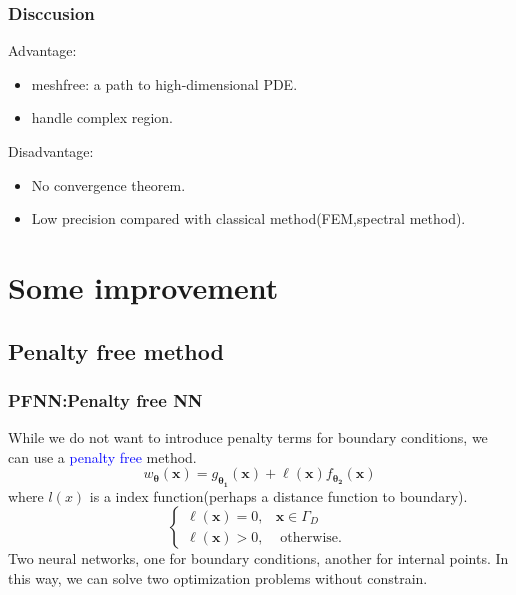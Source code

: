 \documentclass[8pt,aspectratio=15,mathserif]{beamer}
\begin{document}
\begin{frame}
\frametitle{Disccusion}
Advantage:
\begin{itemize}
\item meshfree: a path to high-dimensional PDE.
\item handle complex region.
\end{itemize}
Disadvantage:
\begin{itemize}
\item No convergence theorem.
\item Low precision compared with classical method(FEM,spectral method).
\end{itemize}
\end{frame}

\section{Some improvement}
\subsection{Penalty free method}
\begin{frame}
\frametitle{PFNN:Penalty free NN}
While we do not want to introduce penalty terms for boundary conditions, we can use a \textcolor{blue}{penalty free} method\cite{Penalty_free}.
$$
w_{\boldsymbol{\theta}}(\boldsymbol{x})=g_{\boldsymbol{\theta}_{\mathbf{1}}}(\boldsymbol{x})+\ell(\boldsymbol{x}) f_{\boldsymbol{\theta}_{\mathbf{2}}}(\boldsymbol{x})
$$
where $l(x)$ is a index function(perhaps a distance function to boundary).
$$
\left\{\begin{array}{ll}
\ell(\boldsymbol{x})=0, & \boldsymbol{x} \in \Gamma_{D} \\
\ell(\boldsymbol{x})>0, & \text { otherwise. }
\end{array}\right.
$$
Two neural networks, one for boundary conditions, another for internal points. In this way, we can solve two optimization problems without constrain.
\end{frame}
\end{document}
